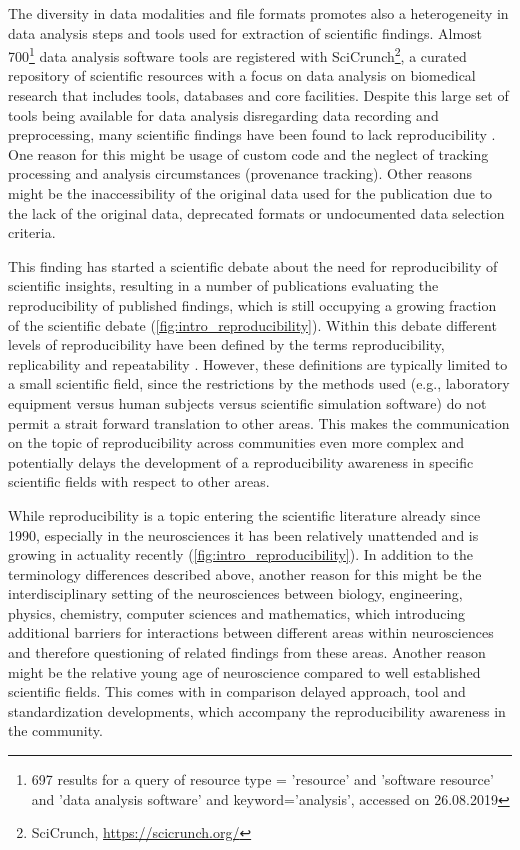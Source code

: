 The diversity in data modalities and file formats promotes also a heterogeneity in data analysis steps and tools used for extraction of scientific findings. Almost 700\footnote{697 results for a query of resource type = 'resource' and 'software resource' and 'data analysis software' and keyword='analysis', accessed on 26.08.2019} data analysis software tools are registered with SciCrunch\footnote{SciCrunch, \url{https://scicrunch.org/}}, a curated repository of scientific resources with a focus on data analysis on biomedical research that includes tools, databases and core facilities. Despite this large set of tools being available for data analysis disregarding data recording and preprocessing, many scientific findings have been found to lack reproducibility \citep{Ioannidis_2005,Ioannidis_2007,Baker_2016, Eisner_2018}. One reason for this might be usage of custom code and the neglect of tracking processing and analysis circumstances (provenance tracking). Other reasons might be the inaccessibility of the original data used for the publication due to the lack of the original data, deprecated formats or undocumented data selection criteria.

This finding has started a scientific debate about the need for reproducibility of scientific insights, resulting in a number of publications evaluating the reproducibility of published findings, which is still occupying a growing fraction of the scientific debate (\cref{fig:intro_reproducibility}). Within this debate different levels of reproducibility have been defined by the terms reproducibility, replicability and repeatability \citep{Plesser_2018}. However, these definitions are typically limited to a small scientific field, since the restrictions by the methods used (e.g., laboratory equipment versus human subjects versus scientific simulation software) do not permit a strait forward translation to other areas. This makes the communication on the topic of reproducibility across communities even more complex and potentially delays the development of a reproducibility awareness in specific scientific fields with respect to other areas.

While reproducibility is a topic entering the scientific literature already since 1990, especially in the neurosciences it has been relatively unattended and is growing in actuality recently (\cref{fig:intro_reproducibility}). In addition to the terminology differences described above, another reason for this might be the interdisciplinary setting of the neurosciences between biology, engineering, physics, chemistry, computer sciences and mathematics, which introducing additional barriers for interactions between different areas within neurosciences and therefore questioning of related findings from these areas. Another reason might be the relative young age of neuroscience compared to well established scientific fields. This comes with in comparison delayed approach, tool and standardization developments, which accompany the reproducibility awareness in the community.

